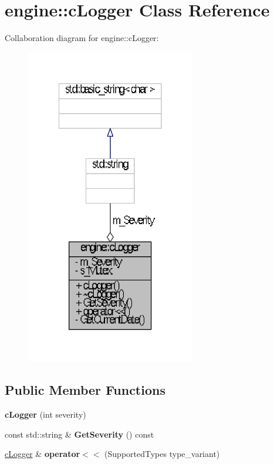 \hypertarget{classengine_1_1cLogger}{\section{engine\-:\-:c\-Logger \-Class \-Reference}
\label{classengine_1_1cLogger}
}


\-Collaboration diagram for engine\-:\-:c\-Logger\-:
\nopagebreak
\begin{figure}[H]
\begin{center}
\leavevmode
\includegraphics[width=210pt]{classengine_1_1cLogger__coll__graph}
\end{center}
\end{figure}
\subsection*{\-Public \-Member \-Functions}
\begin{DoxyCompactItemize}
\item 
\hypertarget{classengine_1_1cLogger_a127edc3f43400830cc8b46a1ccd5d183}{{\bfseries c\-Logger} (int severity)}\label{classengine_1_1cLogger_a127edc3f43400830cc8b46a1ccd5d183}

\item 
\hypertarget{classengine_1_1cLogger_a1473c1a79b0e677476da12f457fd8ff6}{const std\-::string \& {\bfseries \-Get\-Severity} () const }\label{classengine_1_1cLogger_a1473c1a79b0e677476da12f457fd8ff6}

\item 
\hypertarget{classengine_1_1cLogger_afaad3dca17bb3dd399d379e2ddd114b2}{\hyperlink{classengine_1_1cLogger}{c\-Logger} \& {\bfseries operator$<$$<$} (\-Supported\-Types type\-\_\-variant)}\label{classengine_1_1cLogger_afaad3dca17bb3dd399d379e2ddd114b2}

\end{DoxyCompactItemize}
